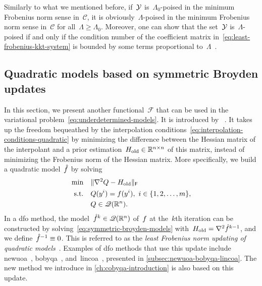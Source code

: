 Similarly to what we mentioned before, if~$\xpt$ is~$\Lambda_0$-poised in the minimum Frobenius norm sense in~$\mathcal{C}$, it is obviously~$\Lambda$-poised in the minimum Frobenius norm sense in~$\mathcal{C}$ for all~$\Lambda \ge \Lambda_0$.
Moreover, one can show that the set~$\xpt$ is~$\Lambda$-poised if and only if the condition number of the coefficient matrix in~\cref{eq:least-frobenius-kkt-system} is bounded by some terms proportional to~$\Lambda$~\cite[Thm.~5.8]{Conn_Scheinberg_Vicente_2009b}.

\subsection{Quadratic models based on symmetric Broyden updates}
\label{subsec:symmetric-broyden-updates}

In this section, we present another functional~$\mathcal{F}$ that can be used in the variational problem~\cref{eq:underdetermined-models}.
It is introduced by \citeauthor{Powell_2004b}~\cite{Powell_2004b}.
It takes up the freedom bequeathed by the interpolation conditions~\cref{eq:interpolation-conditions-quadratic} by minimizing the difference between the Hessian matrix of the interpolant and a prior estimation~$H_{\text{old}} \in \mathbb{R}^{n \times n}$ of this matrix, instead of minimizing the Frobenius norm of the Hessian matrix.
More specifically, we build a quadratic model~$\objm$ by solving
\begin{subequations}
    \label{eq:symmetric-broyden-models}
    \begin{align}
        \min        & \quad \lVert\nabla^2 Q - H_{\text{old}}\rVert_{\mathsf{F}}\\
        \text{s.t.} & \quad Q(y^i) = f(y^i), ~ i \in \{1, 2, \dots, m\},\\
                    & \quad Q \in \mathscr{Q}(\mathbb{R}^n).
    \end{align}
\end{subequations}
In a \gls{dfo} method, the model~$\objm[k] \in \qpoly$ of~$f$ at the~$k$th iteration can be constructed by solving~\cref{eq:symmetric-broyden-models} with~$H_{\text{old}} = \nabla^2 \objm[k - 1]$, and we define~$\objm[-1] \equiv 0$.
This is referred to as the \emph{least Frobenius norm updating of quadratic models}~\cite{Powell_2004b}.
Examples of \gls{dfo} methods that use this update include \gls{newuoa}~\cite{Powell_2006}, \gls{bobyqa}~\cite{Powell_2009}, and~\gls{lincoa}~\cite{Powell_2015}, presented in \cref{subsec:newuoa-bobyqa-lincoa}.
The new method we introduce in \cref{ch:cobyqa-introduction} is also based on this update.

